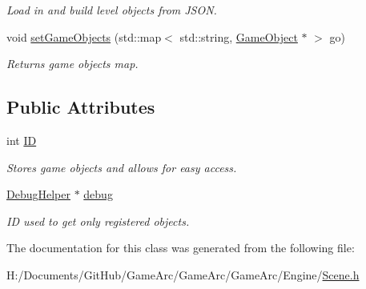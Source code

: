 \begin{DoxyCompactItemize}
\begin{DoxyCompactList}\small\item\em Load in and build level objects from J\+S\+O\+N. \end{DoxyCompactList}\item 
\hypertarget{class_scene_a9a1bad34e21edf3eda7fe8183c034b9c}{void \hyperlink{class_scene_a9a1bad34e21edf3eda7fe8183c034b9c}{set\+Game\+Objects} (std\+::map$<$ std\+::string, \hyperlink{class_game_object}{Game\+Object} $\ast$ $>$ go)}\label{class_scene_a9a1bad34e21edf3eda7fe8183c034b9c}

\begin{DoxyCompactList}\small\item\em Returns game objects map. \end{DoxyCompactList}\end{DoxyCompactItemize}
\subsection*{Public Attributes}
\begin{DoxyCompactItemize}
\item 
\hypertarget{class_scene_ac1e7daf8385257c261a212b3b34d7e28}{int \hyperlink{class_scene_ac1e7daf8385257c261a212b3b34d7e28}{I\+D}}\label{class_scene_ac1e7daf8385257c261a212b3b34d7e28}

\begin{DoxyCompactList}\small\item\em Stores game objects and allows for easy access. \end{DoxyCompactList}\item 
\hypertarget{class_scene_abb41eda003d71ee80315ab9f5da5848e}{\hyperlink{class_debug_helper}{Debug\+Helper} $\ast$ \hyperlink{class_scene_abb41eda003d71ee80315ab9f5da5848e}{debug}}\label{class_scene_abb41eda003d71ee80315ab9f5da5848e}

\begin{DoxyCompactList}\small\item\em I\+D used to get only registered objects. \end{DoxyCompactList}\end{DoxyCompactItemize}


The documentation for this class was generated from the following file\+:\begin{DoxyCompactItemize}
\item 
H\+:/\+Documents/\+Git\+Hub/\+Game\+Arc/\+Game\+Arc/\+Game\+Arc/\+Engine/\hyperlink{_scene_8h}{Scene.\+h}\end{DoxyCompactItemize}
